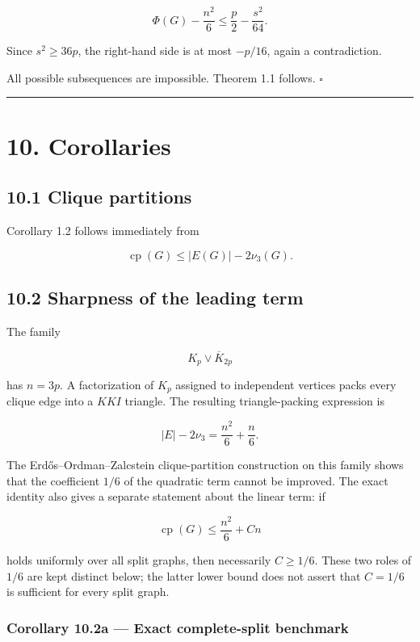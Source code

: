 \documentclass[english,11pt,a4paper]{article}
\begin{document}
\[
\Phi(G)-\frac{n^2}{6}
\le
\frac p2-\frac{s^2}{64}.
\tag{9.20}
\]

Since \(s^2\ge36p\), the right-hand side is at most \(-p/16\), again a
contradiction.

All possible subsequences are impossible. Theorem 1.1 follows.
\(\square\)

\begin{center}\rule{0.5\linewidth}{0.5pt}\end{center}

\section{10. Corollaries}\label{corollaries}

\subsection{10.1 Clique partitions}\label{clique-partitions}

Corollary 1.2 follows immediately from

\[
\operatorname{cp}(G)
\le
|E(G)|-2\nu_3(G).
\]

\subsection{10.2 Sharpness of the leading
term}\label{sharpness-of-the-leading-term}

The family

\[
K_p\vee\overline K_{2p}
\]

has \(n=3p\). A factorization of \(K_p\) assigned to independent
vertices packs every clique edge into a \(KKI\) triangle. The resulting
triangle-packing expression is

\[
|E|-2\nu_3
=
\frac{n^2}{6}+\frac n6.
\tag{10.1}
\]

The Erdős--Ordman--Zalcstein clique-partition construction on this
family shows that the coefficient \(1/6\) of the quadratic term cannot
be improved. The exact identity also gives a separate statement about
the linear term: if

\[
\operatorname{cp}(G)\le \frac{n^2}{6}+Cn
\]

holds uniformly over all split graphs, then necessarily \(C\ge1/6\).
These two roles of \(1/6\) are kept distinct below; the latter lower
bound does not assert that \(C=1/6\) is sufficient for every split
graph.

\subsubsection{Corollary 10.2a --- Exact complete-split
benchmark}\label{corollary-10.2a-exact-complete-split-benchmark}
\end{document}
